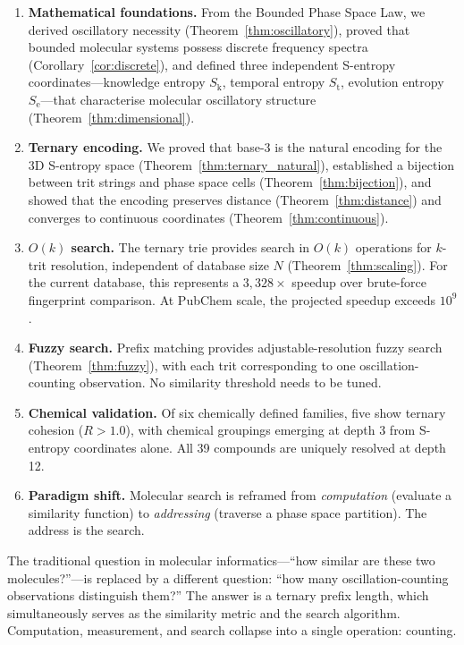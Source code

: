 \documentclass[11pt,twocolumn,a4paper]{article}
\theoremstyle{definition}
\theoremstyle{remark}
\newcommand{\Sk}{S_{\mathrm{k}}}
\newcommand{\St}{S_{\mathrm{t}}}
\newcommand{\Se}{S_{\mathrm{e}}}
\begin{document}
\begin{enumerate}
\item \textbf{Mathematical foundations.} From the Bounded Phase Space Law, we derived oscillatory necessity (Theorem~\ref{thm:oscillatory}), proved that bounded molecular systems possess discrete frequency spectra (Corollary~\ref{cor:discrete}), and defined three independent S-entropy coordinates---knowledge entropy $\Sk$, temporal entropy $\St$, evolution entropy $\Se$---that characterise molecular oscillatory structure (Theorem~\ref{thm:dimensional}).

\item \textbf{Ternary encoding.} We proved that base-3 is the natural encoding for the 3D S-entropy space (Theorem~\ref{thm:ternary_natural}), established a bijection between trit strings and phase space cells (Theorem~\ref{thm:bijection}), and showed that the encoding preserves distance (Theorem~\ref{thm:distance}) and converges to continuous coordinates (Theorem~\ref{thm:continuous}).

\item \textbf{$O(k)$ search.} The ternary trie provides search in $O(k)$ operations for $k$-trit resolution, independent of database size $N$ (Theorem~\ref{thm:scaling}). For the current database, this represents a $3{,}328\times$ speedup over brute-force fingerprint comparison. At PubChem scale, the projected speedup exceeds $10^9$.

\item \textbf{Fuzzy search.} Prefix matching provides adjustable-resolution fuzzy search (Theorem~\ref{thm:fuzzy}), with each trit corresponding to one oscillation-counting observation. No similarity threshold needs to be tuned.

\item \textbf{Chemical validation.} Of six chemically defined families, five show ternary cohesion ($R > 1.0$), with chemical groupings emerging at depth 3 from S-entropy coordinates alone. All 39 compounds are uniquely resolved at depth 12.

\item \textbf{Paradigm shift.} Molecular search is reframed from \emph{computation} (evaluate a similarity function) to \emph{addressing} (traverse a phase space partition). The address is the search.
\end{enumerate}

The traditional question in molecular informatics---``how similar are these two molecules?''---is replaced by a different question: ``how many oscillation-counting observations distinguish them?'' The answer is a ternary prefix length, which simultaneously serves as the similarity metric and the search algorithm. Computation, measurement, and search collapse into a single operation: counting.
\end{document}
